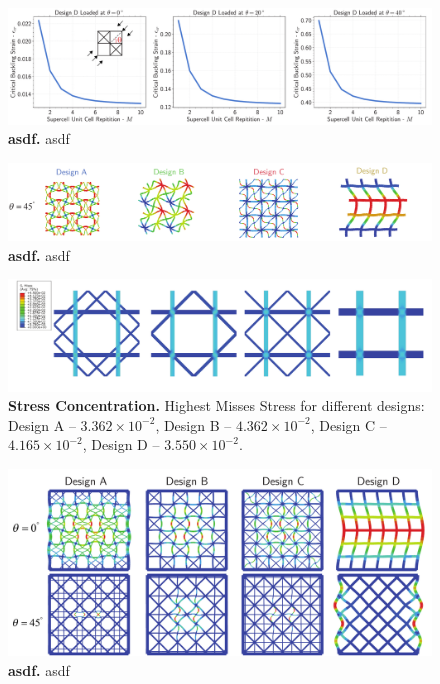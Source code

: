\documentclass[10pt,twoside]{fernandes_supp}
\begin{document}
\begin{figure}
	\centering
	\includegraphics[width=0.9\linewidth]{SFig14.pdf}
	\caption{{\bf asdf.} asdf}
	\label{asdfgas}
\end{figure}

\begin{figure}
	\centering
	\includegraphics[width=0.9\linewidth]{SFig15.pdf}
	\caption{{\bf asdf.} asdf}
	\label{asdfgdfsjgas}
\end{figure}

\begin{figure}
	\centering
	\includegraphics[width=0.9\linewidth]{SFig16.pdf}
	\caption{{\bf Stress Concentration.} Highest Misses Stress for different designs: Design A -- $3.362\times 10^{-2}$, Design B -- $4.362\times 10^{-2}$, Design C -- $4.165\times 10^{-2}$, Design D -- $3.550\times 10^{-2}$.}
	\label{asdfgdfsgasasdf}
\end{figure}

\begin{figure}
	\centering
	\includegraphics[width=0.9\linewidth]{SFig17.pdf}
	\caption{{\bf asdf.} asdf}
	\label{asdfgdjjsgas}
\end{figure}
\end{document}
